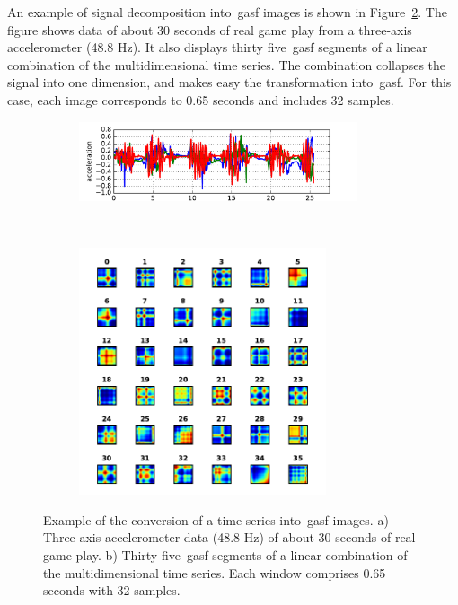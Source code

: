 An example of signal decomposition into~\gls{gasf} images is shown in Figure~\ref{fig:acc_signal_gasfs}. The figure shows data of about 30 seconds of real game play from a three-axis accelerometer (48.8 Hz). It also displays thirty five~\gls{gasf} segments of a linear combination of the multidimensional time series. The combination collapses the signal into one dimension, and makes easy the transformation into~\gls{gasf}. For this case, each image corresponds to 0.65 seconds and includes 32 samples.

\begin{figure}[H]
    \centering
    \begin{subfigure}[h]{\textwidth}
        \centering
        \includegraphics[width=0.9\textwidth]{images/05-modeling/example_signal}
        \label{figure:accelerometer_signal}
        \caption{}
    \end{subfigure} \vspace{-6pt}
    ~
    \begin{subfigure}[h]{0.8\textwidth}
        \centering
        \includegraphics[width=0.8\textwidth]{images/05-modeling/example_gafs_seg}
        \caption{}
    \end{subfigure} \vspace{-6pt}
    \caption{Example of the conversion of a time series into~\gls{gasf} images. a) Three-axis accelerometer data (48.8 Hz) of about 30 seconds of real game play. b) Thirty five~\gls{gasf} segments of a linear combination of the multidimensional time series. Each window comprises 0.65 seconds with 32 samples.}
    \label{fig:acc_signal_gasfs}
\end{figure}

